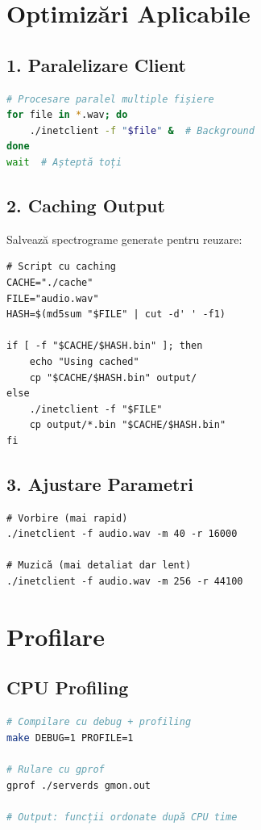 \documentclass[12pt,a4paper,oneside]{book}
\begin{document}
\section{Optimizări Aplicabile}

\subsection{1. Paralelizare Client}

\begin{lstlisting}[language=bash]
# Procesare paralel multiple fișiere
for file in *.wav; do
    ./inetclient -f "$file" &  # Background
done
wait  # Așteptă toți
\end{lstlisting}

\subsection{2. Caching Output}

Salvează spectrograme generate pentru reuzare:

\begin{lstlisting}
# Script cu caching
CACHE="./cache"
FILE="audio.wav"
HASH=$(md5sum "$FILE" | cut -d' ' -f1)

if [ -f "$CACHE/$HASH.bin" ]; then
    echo "Using cached"
    cp "$CACHE/$HASH.bin" output/
else
    ./inetclient -f "$FILE"
    cp output/*.bin "$CACHE/$HASH.bin"
fi
\end{lstlisting}

\subsection{3. Ajustare Parametri}

\begin{lstlisting}
# Vorbire (mai rapid)
./inetclient -f audio.wav -m 40 -r 16000

# Muzică (mai detaliat dar lent)
./inetclient -f audio.wav -m 256 -r 44100
\end{lstlisting}

\section{Profilare}

\subsection{CPU Profiling}

\begin{lstlisting}[language=bash]
# Compilare cu debug + profiling
make DEBUG=1 PROFILE=1

# Rulare cu gprof
gprof ./serverds gmon.out

# Output: funcții ordonate după CPU time
\end{lstlisting}
\end{document}
